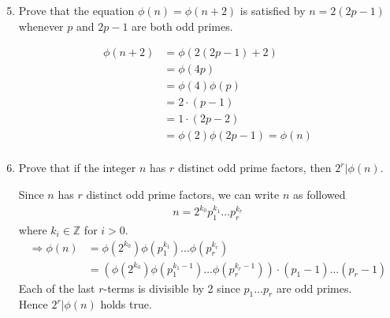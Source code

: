 \documentclass[12pt]{exam}
\theoremstyle{definition}
\begin{document}
\begin{enumerate}
          \setcounter{enumi}{4}
    \item Prove that the equation $\phi(n) = \phi(n + 2)$ is satisfied by $n = 2(2 p - 1)$ whenever $p$ and
          $2 p - 1$ are both odd primes.
          \begin{answer}
              \[
                  \begin{aligned}
                      \phi(n + 2) & = \phi(2(2p-1)+2)             \\
                                  & = \phi(4p)                    \\
                                  & = \phi(4)\phi(p)              \\
                                  & = 2\cdot(p-1)                 \\
                                  & = 1\cdot(2p - 2)              \\
                                  & = \phi(2)\phi(2p-1) = \phi(n) \\
                  \end{aligned}
              \]
          \end{answer}

          \setcounter{enumi}{7}
    \item Prove that if the integer $n$ has $r$ distinct odd prime factors, then $2^r | \phi(n)$.
          \begin{answer}
              Since $n$ has $r$ distinct odd prime factors, we can write $n$ as followed
              \[
                  \begin{aligned}
                      n = 2^{k_0} p^{k_1}_1 \dots p^{k_r}_r
                  \end{aligned}
              \]
              where $k_i \in \mathbb{Z}$ for $i > 0$.
              \[
                  \begin{aligned}
                      \Rightarrow\phi(n) & = \phi(2^{k_0}) \phi(p^{k_1}_1) \dots \phi(p^{k_r}_r)                                 \\
                                         & = (\phi(2^{k_0}) \phi(p^{k_1-1}_1) \dots \phi(p^{k_r-1}_r)) \cdot (p_1-1)\dots(p_r-1)
                  \end{aligned}
              \]
              Each of the last $r$-terms is divisible by 2 since $p_1 \dots p_r$ are odd primes. \\
              Hence $2^r | \phi(n)$ holds true.
          \end{answer}


\end{enumerate}
\end{document}
